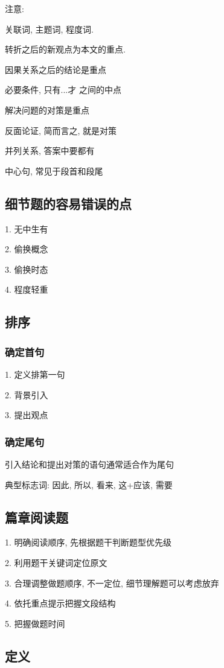 \documentclass[UTF8]{ctexart}
\begin{document}
注意:

关联词, 主题词, 程度词.

转折之后的新观点为本文的重点.

因果关系之后的结论是重点

必要条件, 只有...才 之间的中点

解决问题的对策是重点

反面论证, 简而言之, 就是对策

并列关系, 答案中要都有

中心句, 常见于段首和段尾


\subsection{细节题的容易错误的点}
1. 无中生有

2. 偷换概念

3. 偷换时态

4. 程度轻重

\subsection{排序}

\subsubsection{确定首句}
1. 定义排第一句

2. 背景引入

3. 提出观点

\subsubsection{确定尾句}

引入结论和提出对策的语句通常适合作为尾句

典型标志词: 因此, 所以, 看来, 这+应该, 需要

\subsection{篇章阅读题}
1. 明确阅读顺序, 先根据题干判断题型优先级

2. 利用题干关键词定位原文

3. 合理调整做题顺序, 不一定位, 细节理解题可以考虑放弃

4. 依托重点提示把握文段结构

5. 把握做题时间

\subsection{定义}
\end{document}
